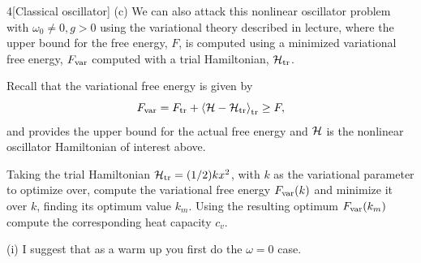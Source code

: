 \documentclass[12pt]{article}
\begin{document}
\begin{problem}{4}[Classical oscillator]
(c) We can also attack this nonlinear oscillator problem with
$\omega_0\neq0,g>0$ using the variational theory described in lecture, where the
upper bound for the free energy, $F$, is computed using a minimized variational
free energy, $F_{\text{var}}$ computed with a trial Hamiltonian, $\mathcal{H}_{\text{tr}}$.

Recall that the variational free energy is given by
\begin{equation}
    F_{\text{var}}=F_{\text{tr}}+\expval{\mathcal{H}-\mathcal{H}_{\text{tr}}}_{\text{tr}}\geq F, 
\end{equation}
and provides the upper bound for the actual free energy and $\mathcal{H}$ is the
nonlinear oscillator Hamiltonian of interest above.

Taking the trial Hamiltonian $\mathcal{H}_{\text{tr}}=(1/2)kx^2$, with $k$ as the variational
parameter to optimize over, compute the variational free energy $F_{\text{var}}(k)$
and minimize it over $k$, finding its optimum value $k_m$. Using the resulting
optimum $F_{\text{var}}(k_m)$ compute the corresponding heat capacity $c_v$.

\qquad(i) I suggest that as a warm up you first do the $\omega=0$ case.


\end{problem}
\end{document}
